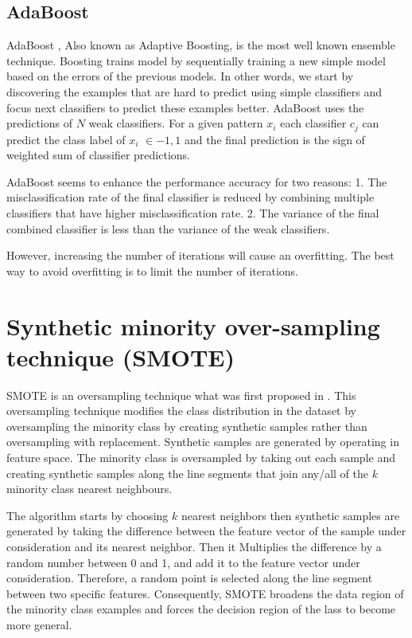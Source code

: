 \documentclass[runningheads,a4paper]{llncs}
\begin{document}
\subsection{AdaBoost}
AdaBoost \cite{schapire2013}, Also known as Adaptive Boosting, is the most well known ensemble technique. Boosting trains model by sequentially training a new simple model based on the errors of the previous models. In other words, we start by discovering the examples that are hard to predict using simple classifiers and focus next classifiers to predict these examples better.
AdaBoost uses the predictions of $N$ weak classifiers. For a given pattern $x_i$ each classifier $c_j$ can predict the class label of $x_i$ $\in {-1,1}$ and the final prediction is the sign of weighted sum of classifier predictions.

AdaBoost seems to enhance the performance accuracy for two reasons:
1. The misclassification rate of the final classifier is reduced by combining multiple classifiers that have higher misclassification rate.
2.  The variance of the final combined classifier is less than the variance of the weak classifiers.

However, increasing the number of iterations will cause an overfitting. The best way to avoid overfitting is to limit the number of iterations.

\section{Synthetic minority over-sampling technique (SMOTE)}
\label{SMOTTE}

SMOTE is an oversampling technique what was first proposed in \cite{chawla2002smote}. This oversampling technique modifies the class distribution in the dataset by oversampling the minority class by creating synthetic samples rather than oversampling with replacement. Synthetic samples are generated by operating in feature space.
The minority class is oversampled by taking out each sample and creating synthetic samples along the line segments that join any/all of the $k$ minority class nearest neighbours. 

The algorithm starts by choosing $k$ nearest neighbors then synthetic samples
are generated by taking the difference between the feature vector of the sample
under consideration and its nearest neighbor. Then it Multiplies the difference by a random number between 0 and 1, and add it to the feature vector under consideration. Therefore, a random point is selected along the line segment between two specific features. Consequently, SMOTE broadens the data region of the minority class examples and forces the decision region of the lass to become more general.
\end{document}
